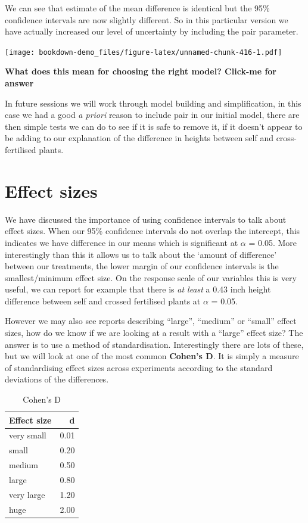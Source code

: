 \documentclass[
]{book}
\begin{document}
We can see that estimate of the mean difference is identical but the 95\% confidence intervals are now slightly different. So in this particular version we have actually increased our level of uncertainty by including the pair parameter.

\texttt{[image: bookdown-demo\_files/figure-latex/unnamed-chunk-416-1.pdf]}

\textbf{What does this mean for choosing the right model? Click-me for answer}

In future sessions we will work through model building and simplification, in this case we had a good \emph{a priori} reason to include pair in our initial model, there are then simple tests we can do to see if it is safe to remove it, if it doesn't appear to be adding to our explanation of the difference in heights between self and cross-fertilised plants.

\hypertarget{effect-sizes}{%
\section{Effect sizes}\label{effect-sizes}}

We have discussed the importance of using confidence intervals to talk about effect sizes. When our 95\% confidence intervals do not overlap the intercept, this indicates we have difference in our means which is significant at \(\alpha\) = 0.05. More interestingly than this it allows us to talk about the `amount of difference' between our treatments, the lower margin of our confidence intervals is the smallest/minimum effect size. On the response scale of our variables this is very useful, we can report for example that there is \emph{at least} a 0.43 inch height difference between self and crossed fertilised plants at \(\alpha\) = 0.05.

However we may also see reports describing ``large'', ``medium'' or ``small'' effect sizes, how do we know if we are looking at a result with a ``large'' effect size? The answer is to use a method of standardisation. Interestingly there are lots of these, but we will look at one of the most common \textbf{Cohen's D}. It is simply a measure of standardising effect sizes across experiments according to the standard deviations of the differences.

\begin{table}

\caption{\label{tab:unnamed-chunk-417}Cohen's D}
\begin{tabular}[t]{l|r}
\hline
Effect size & d\\
\hline
very small & 0.01\\
\hline
small & 0.20\\
\hline
medium & 0.50\\
\hline
large & 0.80\\
\hline
very large & 1.20\\
\hline
huge & 2.00\\
\hline
\end{tabular}
\end{table}
\end{document}
